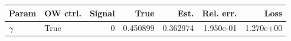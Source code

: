 \begin{tabular}{llrrrrr}
\hline
Param & OW ctrl. & Signal & True & Est. & Rel. err. & Loss \\
\hline
$\gamma$ & True & 0 & 0.450899 & 0.362974 & 1.950e-01 & 1.270e+00 \\
\hline
\end{tabular}
